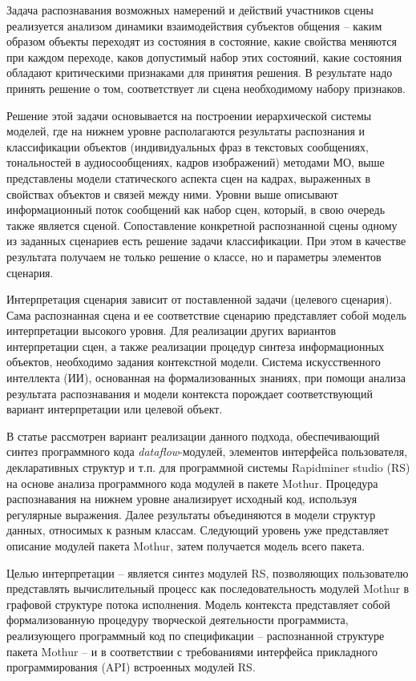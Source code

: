 \documentclass[12pt]{article}
\begin{document}
Задача распознавания возможных намерений и действий участников сцены
реализуется анализом динамики взаимодействия субъектов общения -- каким
образом объекты переходят из состояния в состояние, какие свойства
меняются при каждом переходе, каков допустимый набор этих состояний,
какие состояния обладают критическими признаками для принятия решения. В
результате надо принять решение о том, соответствует ли сцена
необходимому набору признаков.

Решение этой задачи основывается на построении иерархической системы
моделей, где на нижнем уровне располагаются результаты распознания и
классификации объектов (индивидуальных фраз в текстовых сообщениях,
тональностей в аудиосообщениях, кадров изображений) методами МО, выше
представлены модели статического аспекта сцен на кадрах, выраженных в
свойствах объектов и связей между ними. Уровни выше описывают
информационный поток сообщений как набор сцен, который, в свою очередь
также является сценой. Сопоставление конкретной распознанной сцены
одному из заданных сценариев есть решение задачи классификации. При этом
в качестве результата получаем не только решение о классе, но и
параметры элементов сценария.

Интерпретация сценария зависит от поставленной задачи (целевого
сценария). Сама распознанная сцена и ее соответствие сценарию
представляет собой модель интерпретации высокого
уровня. Для реализации других вариантов интерпретации сцен, а также
реализации процедур синтеза информационных объектов, необходимо задания
контекстной модели. Система искусственного интеллекта (ИИ), основанная
на формализованных знаниях, при помощи анализа результата распознавания
и модели контекста порождает соответствующий вариант интерпретации или
целевой объект.

В статье рассмотрен вариант реализации данного подхода, обеспечивающий
синтез программного кода \emph{dataflow}-модулей, элементов интерфейса
пользователя, декларативных структур и т.п. для программной системы
Rapidminer studio (RS) на основе анализа программного кода модулей в
пакете Mothur. Процедура распознавания на нижнем уровне анализирует
исходный код, используя регулярные выражения. Далее результаты
объединяются в модели структур данных, относимых к разным классам.
Следующий уровень уже представляет описание модулей пакета Mothur, затем
получается модель всего пакета.

Целью интерпретации -- является синтез модулей RS, позволяющих
пользователю представлять вычислительный процесс как последовательность
модулей Mothur в графовой структуре потока исполнения. Модель контекста
представляет собой формализованную процедуру творческой деятельности
программиста, реализующего программный код по спецификации --
распознанной структуре пакета Mothur -- и в соответствии с требованиями
интерфейса прикладного программирования (API) встроенных модулей RS.
\end{document}
